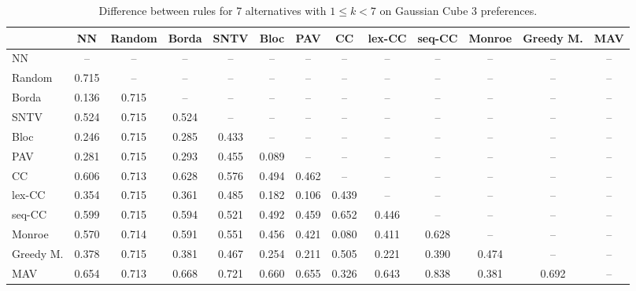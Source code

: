 
\begin{table*}[htbp]
\centering
\begin{tabular}{lcccccccccccc}
\toprule
 & NN & Random & Borda & SNTV & Bloc & PAV & CC & lex-CC & seq-CC & Monroe & Greedy M. & MAV \\
\midrule
NN & -- & -- & -- & -- & -- & -- & -- & -- & -- & -- & -- & -- \\
Random & \cellcolor{blue!71} 0.715 & -- & -- & -- & -- & -- & -- & -- & -- & -- & -- & -- \\
Borda & \cellcolor{blue!13} 0.136 & \cellcolor{blue!71} 0.715 & -- & -- & -- & -- & -- & -- & -- & -- & -- & -- \\
SNTV & \cellcolor{blue!52} 0.524 & \cellcolor{blue!71} 0.715 & \cellcolor{blue!52} 0.524 & -- & -- & -- & -- & -- & -- & -- & -- & -- \\
Bloc & \cellcolor{blue!24} 0.246 & \cellcolor{blue!71} 0.715 & \cellcolor{blue!28} 0.285 & \cellcolor{blue!43} 0.433 & -- & -- & -- & -- & -- & -- & -- & -- \\
PAV & \cellcolor{blue!28} 0.281 & \cellcolor{blue!71} 0.715 & \cellcolor{blue!29} 0.293 & \cellcolor{blue!45} 0.455 & \cellcolor{blue!8} 0.089 & -- & -- & -- & -- & -- & -- & -- \\
CC & \cellcolor{blue!60} 0.606 & \cellcolor{blue!71} 0.713 & \cellcolor{blue!62} 0.628 & \cellcolor{blue!57} 0.576 & \cellcolor{blue!49} 0.494 & \cellcolor{blue!46} 0.462 & -- & -- & -- & -- & -- & -- \\
lex-CC & \cellcolor{blue!35} 0.354 & \cellcolor{blue!71} 0.715 & \cellcolor{blue!36} 0.361 & \cellcolor{blue!48} 0.485 & \cellcolor{blue!18} 0.182 & \cellcolor{blue!10} 0.106 & \cellcolor{blue!43} 0.439 & -- & -- & -- & -- & -- \\
seq-CC & \cellcolor{blue!59} 0.599 & \cellcolor{blue!71} 0.715 & \cellcolor{blue!59} 0.594 & \cellcolor{blue!52} 0.521 & \cellcolor{blue!49} 0.492 & \cellcolor{blue!45} 0.459 & \cellcolor{blue!65} 0.652 & \cellcolor{blue!44} 0.446 & -- & -- & -- & -- \\
Monroe & \cellcolor{blue!56} 0.570 & \cellcolor{blue!71} 0.714 & \cellcolor{blue!59} 0.591 & \cellcolor{blue!55} 0.551 & \cellcolor{blue!45} 0.456 & \cellcolor{blue!42} 0.421 & \cellcolor{blue!8} 0.080 & \cellcolor{blue!41} 0.411 & \cellcolor{blue!62} 0.628 & -- & -- & -- \\
Greedy M. & \cellcolor{blue!37} 0.378 & \cellcolor{blue!71} 0.715 & \cellcolor{blue!38} 0.381 & \cellcolor{blue!46} 0.467 & \cellcolor{blue!25} 0.254 & \cellcolor{blue!21} 0.211 & \cellcolor{blue!50} 0.505 & \cellcolor{blue!22} 0.221 & \cellcolor{blue!39} 0.390 & \cellcolor{blue!47} 0.474 & -- & -- \\
MAV & \cellcolor{blue!65} 0.654 & \cellcolor{blue!71} 0.713 & \cellcolor{blue!66} 0.668 & \cellcolor{blue!72} 0.721 & \cellcolor{blue!66} 0.660 & \cellcolor{blue!65} 0.655 & \cellcolor{blue!32} 0.326 & \cellcolor{blue!64} 0.643 & \cellcolor{blue!83} 0.838 & \cellcolor{blue!38} 0.381 & \cellcolor{blue!69} 0.692 & -- \\
\bottomrule
\end{tabular}

\caption{Difference between rules for 7 alternatives with $1 \leq k < 7$ on Gaussian Cube 3 preferences.}
\label{tab:rule_distance_heatmap-m=[7]-pref_dist=euclidean__args__dimensions=3_-_space=gaussian_cube}
\end{table*}
    